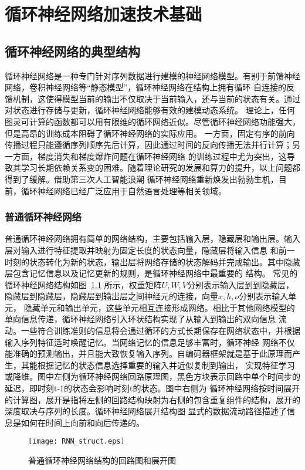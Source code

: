 \chapter{循环神经网络加速技术基础}

\section{循环神经网络的典型结构}
循环神经网络是一种专门针对序列数据进行建模的神经网络模型。有别于前馈神经网络，卷积神经网络等“静态模型”，循环神经网络在结构上拥有循环
自连接的反馈机制，这使得模型当前的输出不仅取决于当前输入，还与当前的状态有关。通过对状态进行存储与更新，循环神经网络能够有效的建模动态系统。
理论上，任何图灵可计算的函数都可以用有限维的循环网络近似。尽管循环神经网络功能强大，但是高昂的训练成本阻碍了循环神经网络的实际应用。
一方面，固定有序的前向传播过程只能遵循序列顺序先后计算，因此通过时间的反向传播无法并行计算；另一方面，梯度消失和梯度爆炸问题在循环神经网络
的训练过程中尤为突出，这导致其学习长期依赖关系变的困难。随着理论研究的发展和算力的提升，以上问题都得到了缓解。借助第三次人工智能浪潮
循环神经网络重新焕发出勃勃生机，目前，循环神经网络已经广泛应用于自然语言处理等相关领域。

\subsection{普通循环神经网络}
普通循环神经网络拥有简单的网络结构，主要包括输入层，隐藏层和输出层。输入层对输入进行特征提取并映射为固定长度的状态向量，隐藏层将输入信息
和前一时刻的状态转化为新的状态，输出层将网络存储的状态解码并完成输出。其中隐藏层包含记忆信息以及记忆更新的规则，是循环神经网络中最重要的
结构。
常见的循环神经网络结构如图~\ref{fig:rnn} 所示，权重矩阵\(U, W, V\)分别表示输入层到到隐藏层，隐藏层到隐藏层，隐藏层到输出层之间神经元的连接，向量\(x, h, o\)分别表示输入单元，
隐藏单元和输出单元，这些单元相互连接形成网络。相比于其他网络模型的单向信息传递，循环神经网络引入环状结构实现了从输入到输出的双向信息
流动。一些符合训练准则的信息将会通过循环的方式长期保存在网络状态中，并根据输入序列特征适时唤醒记忆。当网络记忆的信息足够丰富时，循环神经
网络不仅能准确的预测输出，并且能大致恢复输入序列。自编码器框架就是基于此原理而产生，其能根据记忆的状态信息选择重要的输入并近似复制到输出，
实现特征学习或降维。图中左侧为循环神经网络回路原理图，黑色方块表示回路中单个时间步的延迟，即时刻t-1的状态会影响时刻t的状态。图中右侧为
循环神经网络按时间展开的计算图，展开是指将左侧的回路结构映射为右侧的包含重复组件的结构，展开的深度取决与序列的长度。循环神经网络展开结构图
显式的数据流动路径描述了信息是如何在时间上向前和向后传递的。
\begin{figure}
	\centering
	\texttt{[image: RNN\_struct.eps]}
	\caption{普通循环神经网络结构的回路图和展开图}
	\label{fig:rnn}
\end{figure}

